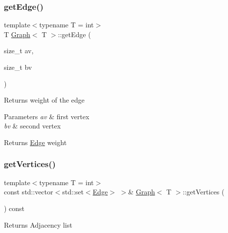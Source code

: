 \subsubsection{\texorpdfstring{get\+Edge()}{getEdge()}}
{\footnotesize\ttfamily template$<$typename T = int$>$ \\
T \hyperlink{class_graph}{Graph}$<$ T $>$\+::get\+Edge (\begin{DoxyParamCaption}\item[{size\+\_\+t}]{av,  }\item[{size\+\_\+t}]{bv }\end{DoxyParamCaption})\hspace{0.3cm}{\ttfamily [inline]}}

Returns weight of the edge 
\begin{DoxyParams}{Parameters}
{\em av} & first vertex \\
\hline
{\em bv} & second vertex \\
\hline
\end{DoxyParams}
\begin{DoxyReturn}{Returns}
\hyperlink{struct_graph_1_1_edge}{Edge} weight 
\end{DoxyReturn}
\mbox{\label{class_graph_ab37935cf08ce2cafd2edac3a503010f4}} 
\subsubsection{\texorpdfstring{get\+Vertices()}{getVertices()}\hspace{0.1cm}{\footnotesize\ttfamily [1/2]}}
{\footnotesize\ttfamily template$<$typename T = int$>$ \\
const std\+::vector$<$std\+::set$<$\hyperlink{struct_graph_1_1_edge}{Edge}$>$ $>$\& \hyperlink{class_graph}{Graph}$<$ T $>$\+::get\+Vertices (\begin{DoxyParamCaption}{ }\end{DoxyParamCaption}) const\hspace{0.3cm}{\ttfamily [inline]}}

\begin{DoxyReturn}{Returns}
Adjacency list 
\end{DoxyReturn}
\mbox{\label{class_graph_ab7c3b45b65d2b72ced442ff01c81da60}} 
